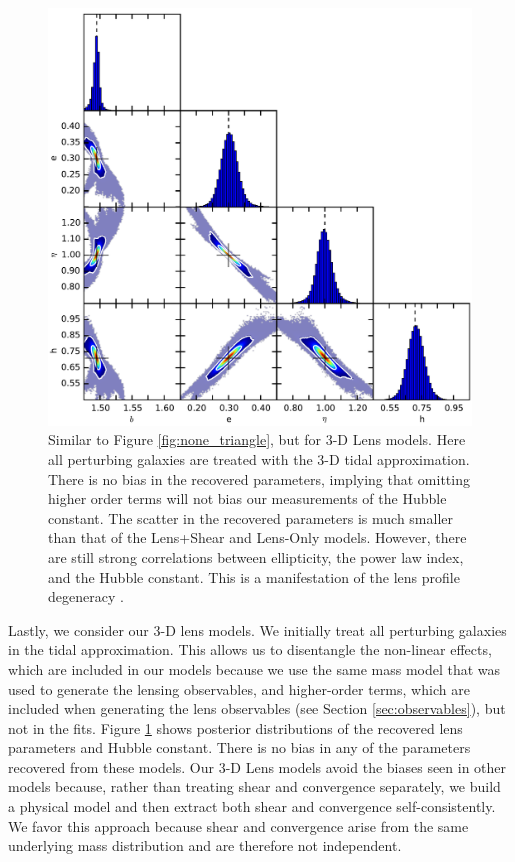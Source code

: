 \documentclass{emulateapj}
\begin{document}
\begin{figure}[ht]
\begin{center}
\includegraphics[width=1\textwidth]{all_los_1e-2.pdf}
\caption{\label{fig:los_triangle} Similar to Figure \ref{fig:none_triangle}, but for 3-D Lens models. Here all perturbing galaxies are treated with the 3-D tidal approximation.  There is no bias in the recovered parameters, implying that omitting higher order terms will not bias our measurements of the Hubble constant. The scatter in the recovered parameters is much smaller than that of the Lens+Shear and Lens-Only models. However, there are still strong correlations between ellipticity, the power law index, and the Hubble constant. This is a manifestation of the lens profile degeneracy \citep{Kochanek02}. %
}
\end{center}
\end{figure}

Lastly, we consider our 3-D lens models. We initially treat all perturbing galaxies in the tidal approximation. This allows us to disentangle the non-linear effects, which are included in our models because we use the same mass model that was used to generate the lensing observables, and higher-order terms, which are included when generating the lens observables (see Section \ref{sec:observables}), but not in the fits. 
Figure \ref{fig:los_triangle} shows posterior distributions of the recovered lens parameters and Hubble constant. There is no bias in any of the parameters recovered from these models. Our 3-D Lens models avoid the biases seen in other models because, rather than treating shear and convergence separately, we build a physical model and then extract both shear and convergence self-consistently. We favor this approach because shear and convergence arise from the same underlying mass distribution and are therefore not independent.
\end{document}
